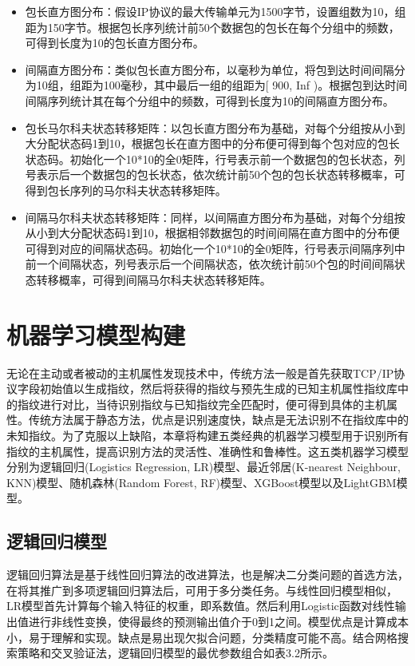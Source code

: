 \begin{itemize}
\item 
包长直方图分布：假设IP协议的最大传输单元为1500字节，设置组数为10，组距为150字节。根据包长序列统计前50个数据包的包长在每个分组中的频数，可得到长度为10的包长直方图分布。
\item 
间隔直方图分布：类似包长直方图分布，以毫秒为单位，将包到达时间间隔分为10组，组距为100毫秒，其中最后一组的组距为[ 900, Inf )。根据包到达时间间隔序列统计其在每个分组中的频数，可得到长度为10的间隔直方图分布。
\item 
包长马尔科夫状态转移矩阵：以包长直方图分布为基础，对每个分组按从小到大分配状态码1到10，根据包长在直方图中的分布便可得到每个包对应的包长状态码。初始化一个10*10的全0矩阵，行号表示前一个数据包的包长状态，列号表示后一个数据包的包长状态，依次统计前50个包的包长状态转移概率，可得到包长序列的马尔科夫状态转移矩阵。
\item 
间隔马尔科夫状态转移矩阵：同样，以间隔直方图分布为基础，对每个分组按从小到大分配状态码1到10，根据相邻数据包的时间间隔在直方图中的分布便可得到对应的间隔状态码。初始化一个10*10的全0矩阵，行号表示间隔序列中前一个间隔状态，列号表示后一个间隔状态，依次统计前50个包的时间间隔状态转移概率，可得到间隔马尔科夫状态转移矩阵。
\end{itemize}

\section{机器学习模型构建}

无论在主动或者被动的主机属性发现技术中，传统方法一般是首先获取TCP/IP协议字段初始值以生成指纹，然后将获得的指纹与预先生成的已知主机属性指纹库中的指纹进行对比，当待识别指纹与已知指纹完全匹配时，便可得到具体的主机属性。传统方法属于静态方法，优点是识别速度快，缺点是无法识别不在指纹库中的未知指纹。为了克服以上缺陷，本章将构建五类经典的机器学习模型用于识别所有指纹的主机属性，提高识别方法的灵活性、准确性和鲁棒性。这五类机器学习模型分别为逻辑回归(Logistics Regression, LR)模型、最近邻居(K-nearest Neighbour, KNN)模型、随机森林(Random Forest, RF)模型、XGBoost模型以及LightGBM模型。

\subsection{逻辑回归模型}

逻辑回归算法是基于线性回归算法的改进算法，也是解决二分类问题的首选方法，在将其推广到多项逻辑回归算法后，可用于多分类任务。与线性回归模型相似，LR模型首先计算每个输入特征的权重，即系数值。然后利用Logistic函数对线性输出值进行非线性变换，使得最终的预测输出值介于0到1之间。模型优点是计算成本小，易于理解和实现。缺点是易出现欠拟合问题，分类精度可能不高。结合网格搜索策略和交叉验证法，逻辑回归模型的最优参数组合如表3.2所示。


